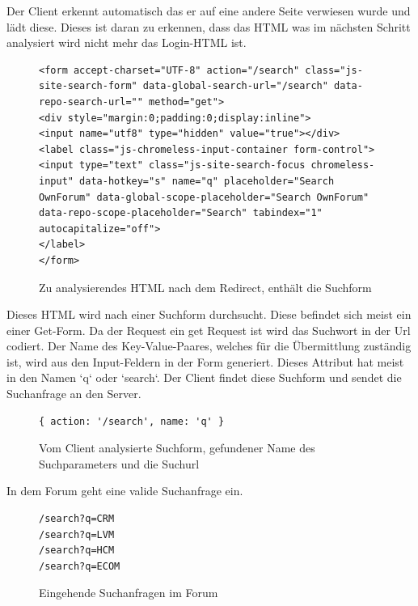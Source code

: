 Der Client erkennt automatisch das er auf eine andere Seite verwiesen wurde und lädt diese. Dieses ist daran zu erkennen, dass das HTML was im nächsten Schritt analysiert wird nicht mehr das Login-HTML ist.

\begin{figure}[h!]
\begin{lstlisting}[language=HTML5]
<form accept-charset="UTF-8" action="/search" class="js-site-search-form" data-global-search-url="/search" data-repo-search-url="" method="get">
<div style="margin:0;padding:0;display:inline">
<input name="utf8" type="hidden" value="true"></div>
<label class="js-chromeless-input-container form-control">
<input type="text" class="js-site-search-focus chromeless-input" data-hotkey="s" name="q" placeholder="Search OwnForum" data-global-scope-placeholder="Search OwnForum" data-repo-scope-placeholder="Search" tabindex="1" autocapitalize="off">
</label>
</form>
\end{lstlisting}
\caption{Zu analysierendes HTML nach dem Redirect, enthält die Suchform}
\end{figure}

Dieses HTML wird nach einer Suchform durchsucht. Diese befindet sich meist ein einer Get-Form. Da der Request ein get Request ist wird das Suchwort in der Url codiert. Der Name des Key-Value-Paares, welches für die Übermittlung zuständig ist, wird aus den Input-Feldern in der Form generiert. Dieses Attribut hat meist in den Namen `q` oder `search`. Der Client findet diese Suchform und sendet die Suchanfrage an den Server.


\begin{figure}[ht]
\begin{lstlisting}[language=HTML5]
{ action: '/search', name: 'q' }
\end{lstlisting}
\caption{Vom Client analysierte Suchform, gefundener Name des Suchparameters und die Suchurl}
\end{figure}

In dem Forum geht eine valide Suchanfrage ein.


\begin{figure}[ht]
\begin{lstlisting}[language=HTML5]
/search?q=CRM
/search?q=LVM
/search?q=HCM
/search?q=ECOM
\end{lstlisting}
\caption{Eingehende Suchanfragen im Forum }
\end{figure}

